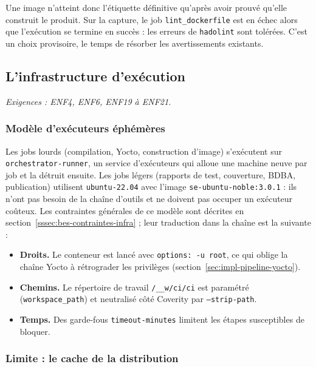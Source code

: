 Une image n'atteint donc l'étiquette définitive qu'après avoir prouvé qu'elle
construit le produit. Sur la capture, le job \texttt{lint\_dockerfile} est en
échec alors que l'exécution se termine en succès : les erreurs de \texttt{hadolint}
sont tolérées. C'est un choix provisoire, le temps de résorber les
avertissements existants.

\subsection{L'infrastructure d'exécution}
\label{ssec:impl-runners}

\emph{Exigences : ENF4, ENF6, ENF19 à ENF21.}

\subsubsection{Modèle d'exécuteurs éphémères}

Les jobs lourds (compilation, Yocto, construction d'image) s'exécutent sur
\texttt{orchestrator-runner}, un service d'exécuteurs qui alloue une machine
neuve par job et la détruit ensuite. Les jobs légers (rapports de test, couverture, BDBA,
publication) utilisent \texttt{ubuntu-22.04} avec l'image
\texttt{se-ubuntu-noble:3.0.1} : ils n'ont pas besoin de la chaîne d'outils et
ne doivent pas occuper un exécuteur coûteux. Les contraintes générales de ce
modèle sont décrites en section~\ref{sssec:bes-contraintes-infra} ; leur
traduction dans la chaîne est la suivante :

\begin{itemize}[nosep]
  \item \textbf{Droits.} Le conteneur est lancé avec \texttt{options: -u root},
        ce qui oblige la chaîne Yocto à rétrograder les privilèges
        (section~\ref{sec:impl-pipeline-yocto}).
  \item \textbf{Chemins.} Le répertoire de travail \texttt{/\_\_w/ci/ci} est
        paramétré (\texttt{workspace\_path}) et neutralisé côté Coverity par
        \texttt{--strip-path}.
  \item \textbf{Temps.} Des garde-fous \texttt{timeout-minutes} limitent les étapes
        susceptibles de bloquer.
\end{itemize}

\subsubsection{Limite : le cache de la distribution}

